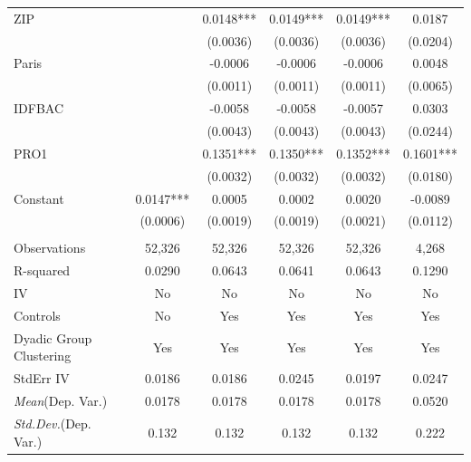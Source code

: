\documentclass[]{article}
\begin{document}
\begin{tabular}{lccccc}
ZIP &  & 0.0148*** & 0.0149*** & 0.0149*** & 0.0187 \\
 &  & (0.0036) & (0.0036) & (0.0036) & (0.0204) \\
Paris &  & -0.0006 & -0.0006 & -0.0006 & 0.0048 \\
 &  & (0.0011) & (0.0011) & (0.0011) & (0.0065) \\
IDFBAC &  & -0.0058 & -0.0058 & -0.0057 & 0.0303 \\
 &  & (0.0043) & (0.0043) & (0.0043) & (0.0244) \\
PRO1 &  & 0.1351*** & 0.1350*** & 0.1352*** & 0.1601*** \\
 &  & (0.0032) & (0.0032) & (0.0032) & (0.0180) \\
Constant & 0.0147*** & 0.0005 & 0.0002 & 0.0020 & -0.0089 \\
 & (0.0006) & (0.0019) & (0.0019) & (0.0021) & (0.0112) \\
 &  &  &  &  &  \\
Observations & 52,326 & 52,326 & 52,326 & 52,326 & 4,268 \\
R-squared & 0.0290 & 0.0643 & 0.0641 & 0.0643 & 0.1290 \\
IV & No & No & No & No & No \\
Controls & No & Yes & Yes & Yes & Yes \\
Dyadic Group Clustering & Yes & Yes & Yes & Yes & Yes \\
StdErr IV & 0.0186 & 0.0186 & 0.0245 & 0.0197 & 0.0247 \\
\textit{Mean}(Dep. Var.) & 0.0178 & 0.0178 & 0.0178 & 0.0178 & 0.0520 \\
 \textit{Std.Dev.}(Dep. Var.) & 0.132 & 0.132 & 0.132 & 0.132 & 0.222 \\ \hline
\end{tabular}
\end{document}

